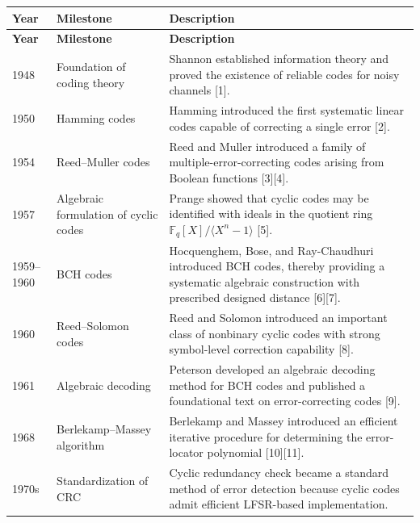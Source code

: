 \documentclass[11pt,oneside]{book}
\theoremstyle{plain}
\theoremstyle{definition}
\theoremstyle{remark}
\begin{document}
\renewcommand{\arraystretch}{1.1}
\begin{longtable}{@{}p{1.8cm}p{4.2cm}>{\raggedright\arraybackslash}p{8.0cm}@{}}
\toprule
\textbf{Year} & \textbf{Milestone} & \textbf{Description} \\
\midrule
\endfirsthead

\toprule
\textbf{Year} & \textbf{Milestone} & \textbf{Description} \\
\midrule
\endhead

\bottomrule
\endfoot

1948
& Foundation of coding theory
& Shannon established information theory and proved the existence of reliable codes for noisy channels {[}1{]}. \\

1950
& Hamming codes
& Hamming introduced the first systematic linear codes capable of correcting a single error {[}2{]}. \\

1954
& Reed--Muller codes
& Reed and Muller introduced a family of multiple-error-correcting codes arising from Boolean functions {[}3{]}{[}4{]}. \\

1957
& Algebraic formulation of cyclic codes
& Prange showed that cyclic codes may be identified with ideals in the quotient ring \(\mathbb{F}_q[X]/\langle X^n-1\rangle\) {[}5{]}. \\

1959--1960
& BCH codes
& Hocquenghem, Bose, and Ray-Chaudhuri introduced BCH codes, thereby providing a systematic algebraic construction with prescribed designed distance {[}6{]}{[}7{]}. \\

1960
& Reed--Solomon codes
& Reed and Solomon introduced an important class of nonbinary cyclic codes with strong symbol-level correction capability {[}8{]}. \\

1961
& Algebraic decoding
& Peterson developed an algebraic decoding method for BCH codes and published a foundational text on error-correcting codes {[}9{]}. \\

1968
& Berlekamp--Massey algorithm
& Berlekamp and Massey introduced an efficient iterative procedure for determining the error-locator polynomial {[}10{]}{[}11{]}. \\

1970s
& Standardization of CRC
& Cyclic redundancy check became a standard method of error detection because cyclic codes admit efficient LFSR-based implementation. \\


\end{longtable}
\end{document}
